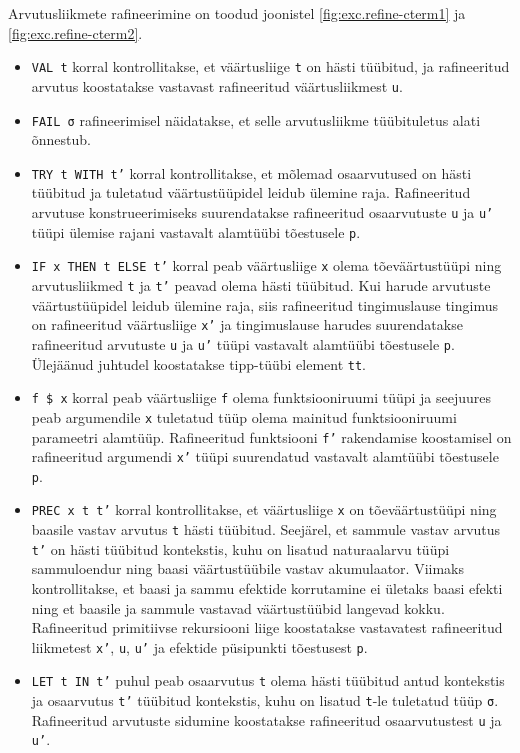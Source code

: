 \documentclass[a4paper,12pt]{article}
\begin{document}
Arvutusliikmete rafineerimine on toodud joonistel \ref{fig:exc.refine-cterm1} ja \ref{fig:exc.refine-cterm2}.
\begin{itemize}
\item {\tt VAL t} korral kontrollitakse, et väärtusliige {\tt t} on hästi tüübitud, ja rafineeritud arvutus koostatakse vastavast rafineeritud väärtusliikmest {\tt u}.
\item {\tt FAIL σ} rafineerimisel näidatakse, et selle arvutusliikme tüübituletus alati õnnestub.
\item {\tt TRY t WITH t'} korral kontrollitakse, et mõlemad osaarvutused on hästi tüübitud ja tuletatud väärtustüüpidel leidub ülemine raja. Rafineeritud arvutuse konstrueerimiseks suurendatakse rafineeritud osaarvutuste {\tt u} ja {\tt u'} tüüpi ülemise rajani vastavalt alamtüübi tõestusele {\tt p}.
\item {\tt IF x THEN t ELSE t'} korral peab väärtusliige {\tt x} olema tõeväärtustüüpi ning arvutusliikmed {\tt t} ja {\tt t'} peavad olema hästi tüübitud. Kui harude arvutuste väärtustüüpidel leidub ülemine raja, siis rafineeritud tingimuslause tingimus on rafineeritud väärtusliige {\tt x'} ja tingimuslause harudes suurendatakse rafineeritud arvutuste {\tt u} ja {\tt u'} tüüpi vastavalt alamtüübi tõestusele {\tt p}. Ülejäänud juhtudel koostatakse tipp-tüübi element {\tt tt}.
\item {\tt f \$ x} korral peab väärtusliige {\tt f} olema funktsiooniruumi tüüpi ja seejuures peab argumendile {\tt x} tuletatud tüüp olema mainitud funktsiooniruumi parameetri alamtüüp. Rafineeritud funktsiooni {\tt f'} rakendamise koostamisel on rafineeritud argumendi {\tt x'} tüüpi suurendatud vastavalt alamtüübi tõestusele {\tt p}.
\item {\tt PREC x t t'} korral kontrollitakse, et väärtusliige {\tt x} on tõeväärtustüüpi ning baasile vastav arvutus {\tt t} hästi tüübitud. Seejärel, et sammule vastav arvutus {\tt t'} on hästi tüübitud kontekstis, kuhu on lisatud naturaalarvu tüüpi sammuloendur ning baasi väärtustüübile vastav akumulaator. Viimaks kontrollitakse, et baasi ja sammu efektide korrutamine ei ületaks baasi efekti ning et baasile ja sammule vastavad väärtustüübid langevad kokku. Rafineeritud primitiivse rekursiooni liige koostatakse vastavatest rafineeritud liikmetest {\tt x'}, {\tt u}, {\tt u'} ja efektide püsipunkti tõestusest {\tt p}.
\item {\tt LET t IN t'} puhul peab osaarvutus {\tt t} olema hästi tüübitud antud kontekstis ja osaarvutus {\tt t'} tüübitud kontekstis, kuhu on lisatud {\tt t}-le tuletatud tüüp {\tt σ}. Rafineeritud arvutuste sidumine koostatakse rafineeritud osaarvutustest {\tt u} ja {\tt u'}.
\end{itemize}
\end{document}
